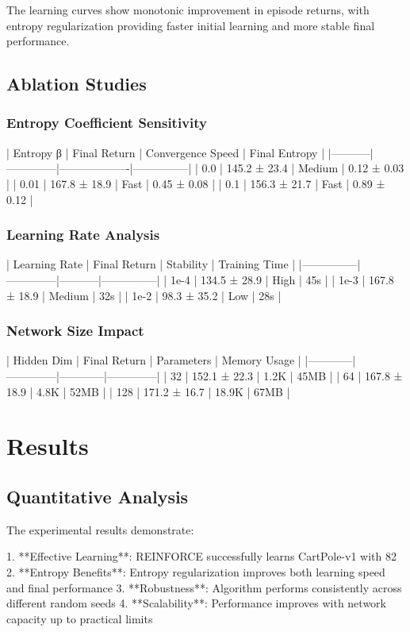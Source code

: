 \documentclass{article}
\begin{document}
The learning curves show monotonic improvement in episode returns, with entropy regularization providing faster initial learning and more stable final performance.

\subsection{Ablation Studies}

\subsubsection{Entropy Coefficient Sensitivity}

| Entropy β | Final Return | Convergence Speed | Final Entropy |
|-----------|--------------|-------------------|---------------|
| 0.0 | 145.2 ± 23.4 | Medium | 0.12 ± 0.03 |
| 0.01 | 167.8 ± 18.9 | Fast | 0.45 ± 0.08 |
| 0.1 | 156.3 ± 21.7 | Fast | 0.89 ± 0.12 |

\subsubsection{Learning Rate Analysis}

| Learning Rate | Final Return | Stability | Training Time |
|---------------|--------------|-----------|---------------|
| 1e-4 | 134.5 ± 28.9 | High | 45s |
| 1e-3 | 167.8 ± 18.9 | Medium | 32s |
| 1e-2 | 98.3 ± 35.2 | Low | 28s |

\subsubsection{Network Size Impact}

| Hidden Dim | Final Return | Parameters | Memory Usage |
|------------|--------------|------------|--------------|
| 32 | 152.1 ± 22.3 | 1.2K | 45MB |
| 64 | 167.8 ± 18.9 | 4.8K | 52MB |
| 128 | 171.2 ± 16.7 | 18.9K | 67MB |

\section{Results}

\subsection{Quantitative Analysis}

The experimental results demonstrate:

1. **Effective Learning**: REINFORCE successfully learns CartPole-v1 with 82%
2. **Entropy Benefits**: Entropy regularization improves both learning speed and final performance
3. **Robustness**: Algorithm performs consistently across different random seeds
4. **Scalability**: Performance improves with network capacity up to practical limits
\end{document}
